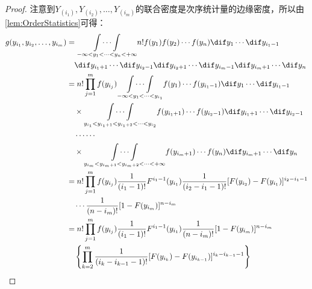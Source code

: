 \begin{proof}
	注意到$Y_{(i_1)},Y_{(i_2)},\dots,Y_{(i_m)}$的联合密度是次序统计量的边缘密度，所以由\cref{lem:OrderStatistics}可得：
	\begin{align*}
		g(y_{i_1},y_{i_2},\dots,y_{i_m})
		&=\underset{-\infty<y_1<\cdots<y_n<+\infty}{\int\cdots\int}n!f(y_1)f(y_2)\cdots f(y_n)\dif y_1\cdots\dif y_{i_1-1} \\
		&\quad\dif y_{i_1+1}\cdots\dif y_{i_2-1}\dif y_{i_2+1}\cdots\dif y_{i_m-1}\dif y_{i_m+1}\cdots\dif y_n \\
		&=n!\prod_{j=1}^{m}f(y_{i_j})\underset{-\infty<y_1<\cdots<y_{i_1}}{\int\cdots\int}f(y_1)\cdots f(y_{i_1-1})\dif y_1\cdots\dif y_{i_1-1} \\
		&\quad\times\underset{y_{i_1}<y_{i_1+1}<y_{i_1+2}<\cdots<y_{i_2}}{\int\cdots\int}f(y_{i_1+1})\cdots f(y_{i_2-1})\dif y_{i_1+1}\cdots\dif y_{i_2-1} \\
		&\quad\cdots\cdots \\
		&\quad\times\underset{y_{i_m}<y_{i_m+1}<y_{i_m+2}<\cdots<+\infty}{\int\cdots\int}f(y_{i_m+1})\cdots f(y_n)\dif y_{i_m+1}\cdots\dif y_n \\
		&=n!\prod_{j=1}^{m}f(y_{i_j})\frac{1}{(i_1-1)!}F^{i_1-1}(y_{i_1})\frac{1}{(i_2-i_1-1)!}[F(y_{i_2})-F(y_{i_1})]^{i_2-i_1-1} \\
		&\quad\cdots\frac{1}{(n-i_m)!}[1-F(y_{i_m})]^{n-i_m} \\
		&=n!\prod_{j=1}^{m}f(y_{i_j})\frac{1}{(i_1-1)!}F^{i_1-1}(y_{i_1})\frac{1}{(n-i_m)!}[1-F(y_{i_m})]^{n-i_m} \\
		&\quad\left\{\prod_{k=2}^{m}\frac{1}{(i_k-i_{k-1}-1)!}[F(y_{i_k})-F(y_{i_{k-1}})]^{i_k-i_{k-1}-1}\right\}\qedhere
	\end{align*}
\end{proof}

